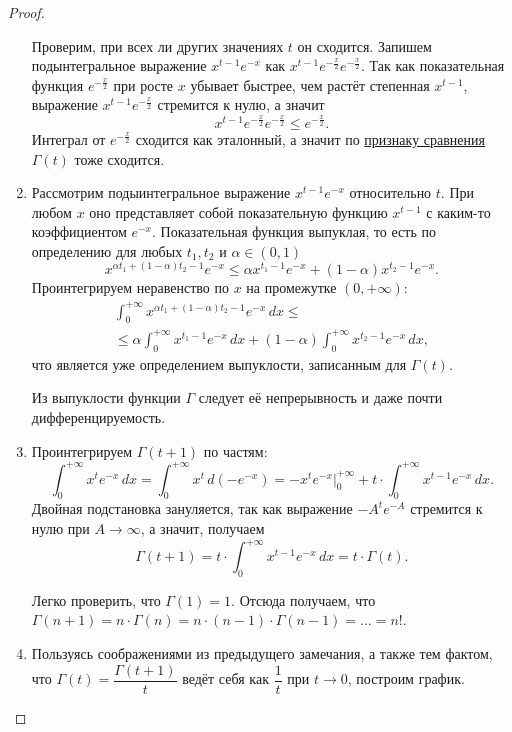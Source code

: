 \begin{proof}
\begin{enumerate}
		Проверим, при всех ли других значениях \(t\) он сходится. Запишем подынтегральное выражение \(x^{t - 1} e^{-x}\) как \(x^{t - 1} e^{-\frac{x}{2}} e^{-\frac{x}{2}}\). Так как показательная функция \(e^{-\frac{x}{2}}\) при росте \(x\) убывает быстрее, чем растёт степенная \(x^{t - 1}\), выражение \(x^{t - 1} e^{-\frac{x}{2}}\) стремится к нулю, а значит \[
		x^{t - 1} e^{-\frac{x}{2}} e^{-\frac{x}{2}} \leqslant  e^{-\frac{x}{2}}.
		\]
		Интеграл от \(e^{-\frac{x}{2}}\) сходится как эталонный, а значит по \hyperlink{priz}{признаку сравнения} \(\Gamma(t)\) тоже сходится.
		\item Рассмотрим подыинтегральное выражение \(x^{t - 1} e^{-x}\) относительно \(t\). При любом \(x\) оно представляет собой показательную функцию \(x^{t - 1}\) с каким-то коэффициентом \(e^{-x}\).
		Показательная функция выпуклая, то есть по определению для любых \(t_1, t_2\) и \(\alpha \in (0, 1)\) \[
		x^{\alpha t_1 + (1 - \alpha) t_2 - 1} e^{-x} \leqslant \alpha x^{t_1 - 1} e^{-x} + (1 - \alpha) x^{t_2 - 1} e^{-x}.
		\]
		Проинтегрируем неравенство по \(x\) на промежутке \((0, +\infty)\): 
		\begin{multline*}
			\int_0^{+\infty} x^{\alpha t_1 + (1 - \alpha) t_2 - 1} e^{-x} \, dx \leqslant \\
			\leqslant \alpha \int_0^{+\infty} x^{t_1 - 1} e^{-x} \, dx + (1 - \alpha) \int_0^{+\infty} x^{t_2 - 1} e^{-x} \, dx,
		\end{multline*}
		что является уже определением выпуклости, записанным для \(\Gamma(t)\).
		\begin{remark}
			Из выпуклости функции \(\Gamma\) следует её непрерывность и даже почти дифференцируемость.
		\end{remark}
		\item Проинтегрируем \(\Gamma(t + 1)\) по частям: \[
		\int_{0}^{+\infty} x^t e^{-x} \, dx = \int_{0}^{+\infty} x^t \, d(-e^{-x}) = -x^t e^{-x} \bigg|_0^{+\infty} + t \cdot \int_{0}^{+\infty} x^{t - 1} e^{-x} \, dx.
		\]
		Двойная подстановка зануляется, так как выражение \(-A^t e^{-A}\) стремится к нулю при \(A \to \infty\), а значит, получаем \[
		\Gamma(t + 1) = t \cdot \int_{0}^{+\infty} x^{t - 1} e^{-x} \, dx = t \cdot \Gamma(t).
		\]
		\begin{remark}
			Легко проверить, что \(\Gamma(1) = 1\). Отсюда получаем, что \(\Gamma(n + 1) = n \cdot \Gamma(n) = n \cdot (n - 1) \cdot \Gamma(n - 1) = \ldots = n!\).
		\end{remark}
		\item Пользуясь соображениями из предыдущего замечания, а также тем фактом, что \(\Gamma(t) = \dfrac{\Gamma(t + 1)}{t}\) ведёт себя как \(\dfrac{1}{t}\) при \(t \to 0\), построим график.
		

\end{enumerate}
\end{proof}
